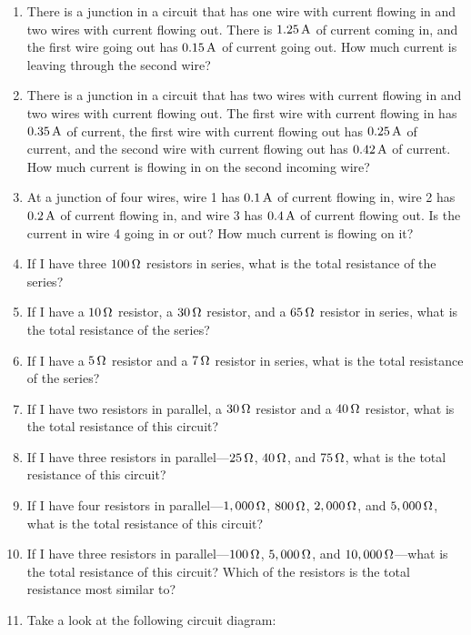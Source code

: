 \begin{enumerate}
\item There is a junction in a circuit that has one wire with current flowing in and two wires with current flowing out.  There is $1.25\,\si{\ampere}$ of current coming in, and the first wire going out has $0.15\,\si{\ampere}$ of current going out.  How much current is leaving through the second wire?
\item There is a junction in a circuit that has two wires with current flowing in and two wires with current flowing out.  The first wire with current flowing in has $0.35\,\si{\ampere}$ of current, the first wire with current flowing out has $0.25\,\si{\ampere}$ of current, and the second wire with current flowing out has $0.42\,\si{\ampere}$ of current.  How much current is flowing in on the second incoming wire?
\item At a junction of four wires, wire 1 has $0.1\,\si{\ampere}$ of current flowing in, wire 2 has $0.2\,\si{\ampere}$ of current flowing in, and wire 3 has $0.4\,\si{\ampere}$ of current flowing out.  Is the current in wire 4 going in or out?  How much current is flowing on it?
\item If I have three $100\,\si{\ohm}$ resistors in series, what is the total resistance of the series?
\item If I have a $10\,\si{\ohm}$ resistor, a $30\,\si{\ohm}$ resistor, and a $65\,\si{\ohm}$ resistor in series, what is the total resistance of the series?
\item If I have a $5\,\si{\ohm}$ resistor and a $7\,\si{\ohm}$ resistor in series, what is the total resistance of the series?
\item If I have two resistors in parallel, a $30\,\si{\ohm}$ resistor and a $40\,\si{\ohm}$ resistor, what is the total resistance of this circuit?
\item If I have three resistors in parallel---$25\,\si{\ohm}$, $40\,\si{\ohm}$, and $75\,\si{\ohm}$, what is the total resistance of this circuit?
\item If I have four resistors in parallel---$1,000\,\si{\ohm}$, $800\,\si{\ohm}$, $2,000\,\si{\ohm}$, and $5,000\,\si{\ohm}$, what is the total resistance of this circuit?
\item If I have three resistors in parallel---$100\,\si{\ohm}$, $5,000\,\si{\ohm}$, and $10,000\,\si{\ohm}$---what is the total resistance of this circuit?  Which of the resistors is the total resistance most similar to?
\item Take a look at the following circuit diagram:
\end{enumerate}
